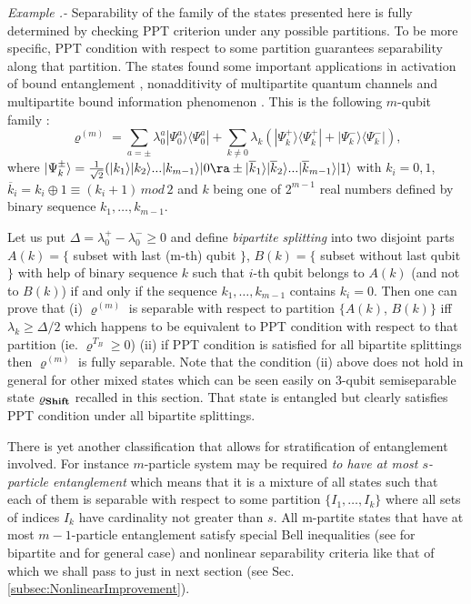 \documentclass[rmp,12pt,preprint]{revtex4-2}
\begin{document}
{\it Example .-} Separability of the family of the states presented
here is fully determined by checking PPT criterion under any possible
partitions. To be more specific, PPT condition with respect to some
partition guarantees separability along that partition. The states
found some \cite{DCpur,DurC_multi_dist2000} important applications in
activation of bound entanglement \cite{DurCirac_activation},
nonadditivity of multipartite quantum channels \cite{DuHoCi04} and
multipartite bound information phenomenon
\cite{AcinCM-MultiBoundInfo}.  This is the following $m$-qubit family
\cite{DCpur}:
\begin{equation}
\varrho^{(m)}=\sum_{a=\pm}\lambda_{0}^{a} |\Psi_{0}^{a}\rangle
\langle \Psi_{0}^{a}| + \sum_{k \neq
0}\lambda_{k}(|\Psi_{k}^{+}\rangle \langle \Psi_{k}^{+}| +
|\Psi_{k}^{-}\rangle \langle \Psi_{k}^{-}|), \label{mCirac}
\end{equation}
where $|\Psi_{k}^{\pm}\rangle=\frac{1}{\sqrt{2}}(|k_{1}\rangle|k_{2}\rangle...|k_{m-1}\rangle
|0\ra \pm |\overline{k}_{1}\rangle|
\overline{k}_{2}\rangle...|\overline{k}_{m-1} \rangle |1\rangle$
with $k_{i}=0,1$, $\overline{k}_{i}=k_{i}\oplus 1 \equiv
(k_{i}+1)\, mod\, 2$ and $k$ being one of $2^{m-1}$ real numbers
defined by binary sequence $k_{1}, \ldots ,k_{m-1}$.

Let us put
$\Delta=\lambda_0^{+}-\lambda_0^{-}\geq 0$ and  define {\it
bipartite splitting} into two disjoint parts $A(k)=\{$ subset with
last (m-th) qubit $\}$, $B(k)=\{$ subset without last qubit $\}$
with help of binary sequence $k$ such that $i$-th qubit belongs to
$A(k)$ (and not to $B(k)$) if and only if the sequence $k_{1}, \ldots
,k_{m-1}$ contains $k_{i}=0$. Then one can prove \cite{DCpur} that
(i) $\varrho^{(m)}$ is separable with respect to partition $\{
A(k)$, $B(k) \}$ iff  $\lambda_{k}\geq \Delta/2$ which happens
to be equivalent to PPT condition with respect to that partition
(ie. $\varrho^{T_{B}}\geq 0$) (ii) if PPT condition is satisfied for
all bipartite splittings then $\varrho^{(m)}$ is fully separable.
Note that the condition (ii) above does not hold in general for
other mixed states  which can be seen easily on 3-qubit
semiseparable state $\varrho_{\bf Shift}$ recalled in this section.
That state is entangled but clearly satisfies PPT condition under
all bipartite splittings.


There is yet another classification that allows for stratification of
entanglement involved. For instance $m$-particle system may be
required {\it to have at most $s$-particle entanglement} which means
that it is a mixture of all states such that each of them is separable
with respect to some partition $\{ I_{1}, \ldots, I_{k} \}$ where all
sets of indices $I_{k}$ have cardinality not greater than $s$. All
m-partite states that have at most $m-1$-particle entanglement satisfy
special Bell inequalities (see \cite{Svetlichny1} for bipartite and
\cite{Svetlichny} for general case) and nonlinear separability
criteria like that of \cite{MaasssenU1988} which we shall pass to just
in next section (see Sec.  \ref{subsec:NonlinearImprovement}).
\end{document}

